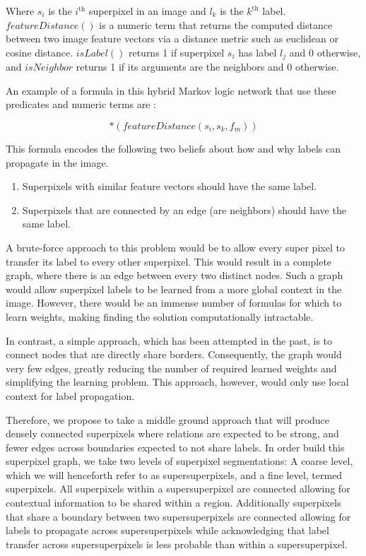 \documentclass{article} %
\begin{document}
\noindent Where $s_i$ is the $i^\textrm{th}$ superpixel in an image and $l_k$ is the $k^\textrm{th}$ label. $featureDistance()$ is a numeric term that returns the computed distance between two image feature vectors via a distance metric such as euclidean or cosine distance. $isLabel()$ returns 1 if superpixel $s_i$ has label $l_j$ and 0 otherwise, and $isNeighbor$ returns 1 if its arguments are the neighbors and 0 otherwise. 

An example of a formula in this hybrid Markov logic network that use these predicates and numeric terms are :

\begin{equation*}
	[isNeighbor(s_i,s_j) => (isLabel(s_i,l_k) <=> isLabel(s_k,l_m))]*(featureDistance(s_i, s_k, f_m))
\end{equation*}

\noindent This formula encodes the following two beliefs about how and why labels can propagate in the image.

\begin{enumerate}
\item
	Superpixels with similar feature vectors should have the same label.
\item
	Superpixels that are connected by an edge (are neighbors) should have the same label.
\end{enumerate}

A brute-force approach to this problem would be to allow every super pixel to transfer its label to every other superpixel. This would result in a complete graph, where there is an edge between every two distinct nodes. Such a graph would allow superpixel labels to be learned from a more global context in the image. However, there would be an immense number of formulas for which to learn weights, making finding the solution computationally intractable. 

In contrast, a simple approach, which has been attempted in the past, \cite{} %
is to connect nodes that are directly share borders. Consequently, the graph would very few edges, greatly reducing the number of required learned weights and simplifying the learning problem. This approach, however, would only use local context for label propagation.

Therefore, we propose to take a middle ground approach that will produce densely connected superpixels where relations are expected to be strong, and fewer edges across boundaries expected to not share labels. In order build this superpixel graph, we take two levels of superpixel segmentations: A coarse level, which we will henceforth refer to as supersuperpixels, and a fine level, termed superpixels. All superpixels within a supersuperpixel are connected allowing for contextual information to be shared within a region. Additionally superpixels that share a boundary between two supersuperpixels are connected allowing for labels to propagate across supersuperpixels while acknowledging that label transfer across supersuperpixels is less probable than within a supersuperpixel.
\end{document}
